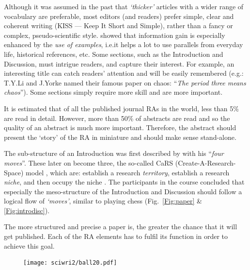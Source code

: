 \documentclass[graybox,envcountchap,sectrefs,UStrade]{svmono}
\begin{document}
Although it was assumed in the past that \emph{`thicker'} articles with a wider range of vocabulary are preferable, most editors (and readers) prefer simple, clear and coherent writing (KISS --- Keep It Short and Simple), rather than a fancy or complex, pseudo-scientific style. \citet{Funkhouser1971} showed that information gain is especially enhanced by the \emph{use of examples}, i.e.\@ it helps a lot to use parallels from everyday life, historical references, etc. Some sections, such as the Introduction and Discussion, must intrigue readers, and capture their interest. For example, an interesting title can catch readers' attention and will be easily remembered (e.g.: T.Y.\@ Li and J.\@ Yorke named their famous paper on chaos: ``\emph{The period three means chaos}''). Some sections simply require more skill and are more important. \par

It is estimated that of all the published journal RAs in the world, less than 5\% are read in detail. However, more than 50\% of abstracts are read and so the quality of an abstract is much more important. Therefore, the abstract should present the `story' of the RA in miniature and should make sense stand-alone.\par

The sub-structure of an Introduction was first described by \citet{swales1981aspects} with his ``\emph{four moves}''. These later on become three, the so-called CaRS (Create-A-Research-Space) model , which are: establish a research \emph{territory}, establish a research \emph{niche}, and then occupy the niche \citep{swales2004academic}. The participants in the course concluded that especially the meso-structure of the Introduction and Discussion should follow a logical flow of \emph{`moves'}, similar to playing chess (Fig.\@~\ref{Fig:paper} \& \ref{Fig:introdisc}).

The more structured and precise a paper is, the greater the chance that it will get published. Each of the RA elements has to fulfil its function in order to achieve this goal. \par

\begin{figure}
\vspace{-20pt}
\texttt{[image: sciwri2/ball20.pdf]}
\vspace{-20pt}
\end{figure}
\end{document}
